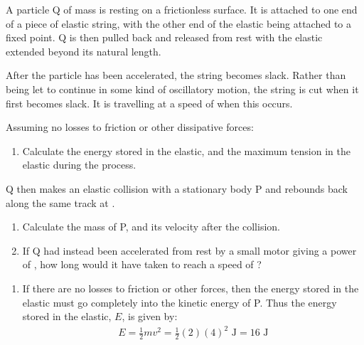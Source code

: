
\begin{problem}[AO1984PIQ1a]
{A particle Q of mass  is resting on a frictionless surface. It is attached to one end of a piece of elastic string, with the other end of the elastic being attached to a fixed point. Q is then pulled back and released from rest with the elastic extended  beyond its natural length. 

After the particle has been accelerated, the string becomes slack. Rather than being let to continue in some kind of oscillatory motion, the string is cut when it first becomes slack. It is travelling at a speed of  when this occurs.

Assuming no losses to friction or other dissipative forces:
\begin{enumerate}
	\item Calculate the energy stored in the elastic, and the maximum tension in the elastic during the process.
\end{enumerate}
Q then makes an elastic collision with a stationary body P and rebounds back along the same track at . 
\begin{enumerate}[resume]
	\item Calculate the mass of P, and its velocity after the collision.
	\item If Q had instead been accelerated from rest by a small motor giving a power of , how long would it have taken to reach a speed of ?
\end{enumerate}
\vspace{-0.4cm}
}
{}
{\begin{enumerate}
	\item If there are no losses to friction or other forces, then the energy stored in the elastic must go completely into the kinetic energy of P. Thus the energy stored in the elastic, $E$, is given by:
\begin{align*} 
E = \frac{1}{2}mv^{2} = \frac{1}{2}(2)(4)^{2} \textrm{ J} = 16 \textrm{ J} 
\end{align*}


\end{enumerate}}
\end{problem}
